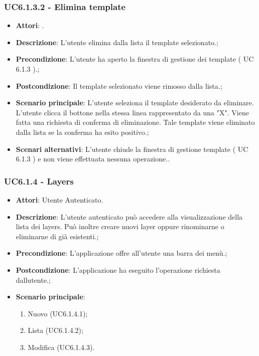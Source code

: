 \subsubsection{UC6.1.3.2 - Elimina template} 
\label{sssec:UC6.1.3.2} 
\begin{itemize} 
\item \textbf{Attori}: .
\item \textbf{Descrizione}: L'utente elimina dalla lista il template selezionato.;
\item \textbf{Precondizione}: L'utente ha aperto la finestra di gestione dei template ( UC 6.1.3 ).;
\item \textbf{Postcondizione}: Il template selezionato viene rimosso dalla lista.;
\item \textbf{Scenario principale}: L'utente seleziona il template desiderato da eliminare.
L'utente clicca il bottone nella stessa linea rappresentato da una "X".
Viene fatta una richiesta di conferma di eliminazione.
Tale template viene eliminato dalla lista se la conferma ha esito positivo.;\item \textbf{Scenari alternativi}: L'utente chiude la finestra di gestione template ( UC 6.1.3 ) e non viene effettuata nessuna operazione..
\end{itemize} 
\subsubsection{UC6.1.4 - Layers} 
\label{sssec:UC6.1.4} 
\begin{itemize} 
\item \textbf{Attori}: Utente Autenticato.
\item \textbf{Descrizione}: L’utente autenticato può accedere alla visualizzazione della lista dei layers. Può inoltre creare nuovi layer oppure rinominarne o eliminarne di già esistenti.;
\item \textbf{Precondizione}: L’applicazione offre all’utente una barra dei menù.;
\item \textbf{Postcondizione}: L'applicazione ha eseguito l'operazione richiesta dallutente.;
\item \textbf{Scenario principale}: \begin{enumerate}\item Nuovo (UC6.1.4.1);\item Lista (UC6.1.4.2);\item Modifica (UC6.1.4.3). 
 \end{enumerate}
\end{itemize} 

